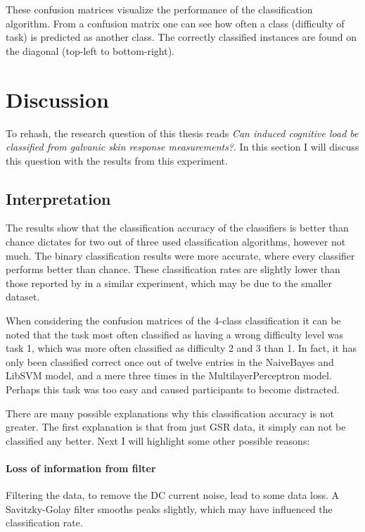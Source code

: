\documentclass[11pt,leqno,a4paper]{report} %
\begin{document}
These confusion matrices visualize the performance of the classification algorithm. From a confusion matrix one can see how often a class (difficulty of task) is predicted as another class. The correctly classified instances are found on the diagonal (top-left to bottom-right).





\chapter{Discussion}

To rehash, the research question of this thesis reads \emph{Can induced cognitive load be classified from galvanic skin response measurements?}. In this section I will discuss this question with the results from this experiment.

\section{Interpretation}

The results show that the classification accuracy of the classifiers is better than chance dictates for two out of three used classification algorithms, however not much. The binary classification results were more accurate, where every classifier performs better than chance.
These classification rates are slightly lower than those reported by \citet{Nourbakhsh2013} in a similar experiment, which may be due to the smaller dataset.

When considering the confusion matrices of the 4-class classification it can be noted that the task most often classified as having a wrong difficulty level was task 1, which was more often classified as difficulty 2 and 3 than 1. In fact, it has only been classified correct once out of twelve entries in the NaiveBayes and LibSVM model, and a mere three times in the MultilayerPerceptron model. Perhaps this task was too easy and caused participants to become distracted.

There are many possible explanations why this classification accuracy is not greater. The first explanation is that from just GSR data, it simply can not be classified any better. Next I will highlight some other possible reasons:

\subsubsection{Loss of information from filter}
Filtering the data, to remove the DC current noise, lead to some data loss. A Savitzky-Golay filter smooths peaks slightly, which may have influenced the classification rate.
\end{document}
